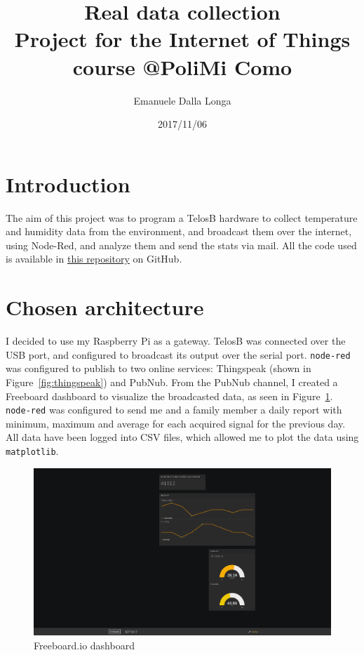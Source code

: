 \documentclass[11pt]{article}
\title{\textbf{Real data collection}\\
				\large Project for the Internet of Things course @PoliMi Como}
\author{Emanuele Dalla Longa}
\date{2017/11/06}
\begin{document}
\maketitle

\section{Introduction}
The aim of this project was to program a TelosB hardware to collect temperature and humidity data from the environment, and broadcast them over the internet, using Node-Red, and analyze them and send the stats via mail. All the code used is available in \href{https://github.com/infinitesnow/IOT2016}{this repository} on GitHub.

\section{Chosen architecture}
I decided to use my Raspberry Pi as a gateway. TelosB was connected over the USB port, and configured to broadcast its output over the serial port. \texttt{node-red} was configured to publish to two online services: Thingspeak (shown in Figure~\ref{fig:thingspeak}) and PubNub. From the PubNub channel, I created a Freeboard dashboard to visualize the broadcasted data, as seen in Figure~\ref{fig:freeboard}. \texttt{node-red} was configured to send me and a family member a daily report with minimum, maximum and average for each acquired signal for the previous day. All data have been logged into CSV files, which allowed me to plot the data using \texttt{matplotlib}.

\begin{figure}
\includegraphics[width=\textwidth]{freeboard}
\caption{Freeboard.io dashboard}
\label{fig:freeboard}
\end{figure}
\end{document}
